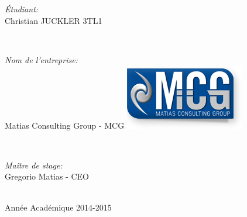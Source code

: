 \begin{titlepage}
\begin{minipage}{0.4\textwidth}
\begin{flushleft} \large
\emph{\'Etudiant:}\\
Christian \textsc{JUCKLER} 3TL1 %
\end{flushleft}
\end{minipage}\\[1cm]
\begin{minipage}{0.4\textwidth}
\begin{flushleft} \large
\emph{Nom de l'entreprise:} \\
Matias Consulting Group - MCG %
\includegraphics{mcg.png}
\end{flushleft}
\end{minipage}\\[1cm]
\begin{minipage}{0.4\textwidth}
\begin{flushleft} \large
\emph{Maître de stage:} \\
Gregorio Matias - CEO %
\end{flushleft}
\end{minipage}\\[4cm]



{\large Année Académique 2014-2015}\\[3cm] %

\vfill %

\end{titlepage}